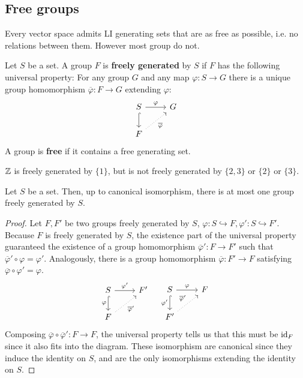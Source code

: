 \subsection{Free groups}
Every vector space admits LI generating sets that are as free as possible, i.e. no relations between them. However most group do not.
\begin{definition}
    Let $S$ be a set. A group $F$ is \textbf{freely generated} by $S$ if $F$ has the following universal property: For any group $G$ and any map $\varphi  \colon S \to G$ there is a unique group homomorphism $\overline{\varphi }\colon F \to G$ extending $\varphi $:
    \[
\begin{tikzcd}
S \arrow[r, "\varphi"] \arrow[d, hook]      & G \\
F \arrow[ru, "\overline{\varphi}"', dotted] &  
\end{tikzcd}
    \] A group is \textbf{free} if it contains a free generating set.
\end{definition}
\begin{example}
    $\mathbb{Z}$ is freely generated by $\{1\} $, but is not freely generated by $\{2,3\} $ or $\{2\} $ or $\{3\} $.
\end{example}
\begin{prop}
   Let $S$ be a set. Then, up to canonical isomorphism, there is at most one group freely generated by $S$. 
\end{prop}
\begin{proof}
    Let $F,F'$ be two groups freely generated by $S$, $\varphi  \colon S \hookrightarrow F, \varphi ' \colon S \hookrightarrow F'  $. Because $F$ is freely generated by $S$, the existence part of the universal property guaranteed the existence of a group homomorphism $\overline{\varphi }' \colon F \to F'$ such that $\overline{\varphi }' \circ \varphi  = \varphi '$. Analogously, there is a group homomorphism $\overline{\varphi }\colon F' \to F$ satisfying  $\overline{\varphi }\circ \varphi ' = \varphi $.
    \[
    \begin{tikzcd}
S \arrow[r, "\varphi'"] \arrow[d, "\varphi"', hook] & F' \\
F \arrow[ru, "\overline{\varphi}'"', dotted]        &   
\end{tikzcd}\quad
    \begin{tikzcd}
S \arrow[r, "\varphi"] \arrow[d, "\varphi'"', hook] & F \\
F' \arrow[ru, "\overline{\varphi}'", dotted]        &   
\end{tikzcd}
    \] Composing $\overline{\varphi } \circ \overline{\varphi }' \colon F \to F$, the universal property tells us that this must be $\operatorname{id}_F$ since it also fits into the diagram. These isomorphism are canonical since they induce the identity on $S$, and are the only isomorphisms extending the identity on $S$.
\end{proof}
